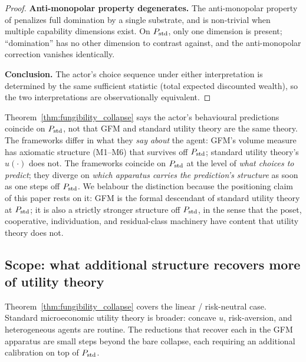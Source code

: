 \begin{proof}
\medskip\noindent\textbf{Anti-monopolar property degenerates.}
The anti-monopolar property of \citep[Proposition~6]{lasser2026horizon}
penalizes full domination by a single substrate, and is non-trivial
when multiple capability dimensions exist.  On $P_{\mathrm{std}}$, only one
dimension is present; ``domination'' has no other dimension to
contrast against, and the anti-monopolar correction vanishes
identically.

\medskip\noindent\textbf{Conclusion.}
The actor's choice sequence under either interpretation is determined
by the same sufficient statistic (total expected discounted wealth),
so the two interpretations are observationally equivalent.
\end{proof}

\begin{remark}
\label{rem:obs_equiv}
Theorem~\ref{thm:fungibility_collapse} says the actor's behavioural
predictions coincide on $P_{\mathrm{std}}$, not that GFM and standard utility
theory are the same theory.  The frameworks differ in what they
\emph{say about} the agent: GFM's volume measure has axiomatic
structure (M1--M6) that survives off $P_{\mathrm{std}}$; standard utility
theory's $u(\cdot)$ does not.  The frameworks coincide on $P_{\mathrm{std}}$ at
the level of \emph{what choices to predict}; they diverge on
\emph{which apparatus carries the prediction's structure} as soon as
one steps off $P_{\mathrm{std}}$.  We belabour the distinction because the
positioning claim of this paper rests on it: GFM is the formal
descendant of standard utility theory at $P_{\mathrm{std}}$; it is also a
strictly stronger structure off $P_{\mathrm{std}}$, in the sense that the
poset, cooperative, individuation, and residual-class machinery
have content that utility theory does not.
\end{remark}

\subsection{Scope: what additional structure recovers more of utility theory}
\label{sec:fc_scope}

Theorem~\ref{thm:fungibility_collapse} covers the linear / risk-neutral
case.  Standard microeconomic utility theory is broader:
concave $u$, risk-aversion, and heterogeneous agents are routine.
The reductions that recover each in the GFM apparatus are small
steps beyond the bare collapse, each requiring an additional
calibration on top of $P_{\mathrm{std}}$.

